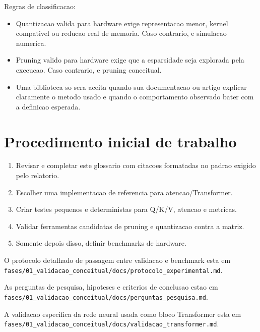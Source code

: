 Regras de classificacao:


\begin{itemize}
\item Quantizacao valida para hardware exige representacao menor, kernel compativel
ou reducao real de memoria. Caso contrario, e simulacao numerica.
\item Pruning valido para hardware exige que a esparsidade seja explorada pela
execucao. Caso contrario, e pruning conceitual.
\item Uma biblioteca so sera aceita quando sua documentacao ou artigo explicar
claramente o metodo usado e quando o comportamento observado bater com a
definicao esperada.
\end{itemize}


\section{Procedimento inicial de trabalho}


\begin{enumerate}
\item Revisar e completar este glossario com citacoes formatadas no padrao exigido
pelo relatorio.
\item Escolher uma implementacao de referencia para atencao/Transformer.
\item Criar testes pequenos e deterministas para Q/K/V, atencao e metricas.
\item Validar ferramentas candidatas de pruning e quantizacao contra a matriz.
\item Somente depois disso, definir benchmarks de hardware.
\end{enumerate}



O protocolo detalhado de passagem entre validacao e benchmark esta em \texttt{fases/\allowbreak{}01\_\allowbreak{}validacao\_\allowbreak{}conceitual/\allowbreak{}docs/\allowbreak{}protocolo\_\allowbreak{}experimental.\allowbreak{}md}.




As perguntas de pesquisa, hipoteses e criterios de conclusao estao em \texttt{fases/\allowbreak{}01\_\allowbreak{}validacao\_\allowbreak{}conceitual/\allowbreak{}docs/\allowbreak{}perguntas\_\allowbreak{}pesquisa.\allowbreak{}md}.




A validacao especifica da rede neural usada como bloco Transformer esta em \texttt{fases/\allowbreak{}01\_\allowbreak{}validacao\_\allowbreak{}conceitual/\allowbreak{}docs/\allowbreak{}validacao\_\allowbreak{}transformer.\allowbreak{}md}.



